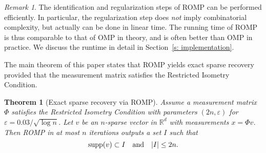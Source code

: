 \documentclass[12pt]{amsart}
\newlength{\algorithmwidth}
\theoremstyle{plain}
\newtheorem{theorem}{Theorem}[section]
\theoremstyle{definition}
\theoremstyle{remark}
\newtheorem*{remark}{Remark}
\numberwithin{equation}{section}
\begin{document}

    \bigskip
  
  \begin{remark} The identification and regularization steps of ROMP can be performed
  efficiently. In particular, the regularization step does \textit{not} imply combinatorial 
  complexity, but actually can be done in linear time. 
  The running time of ROMP is thus comparable to that of OMP in theory, 
  and is often better than OMP in practice. We discuss the runtime in detail in Section~\ref{s: implementation}.
  \end{remark}

The main theorem of this paper states that ROMP yields exact sparse recovery
provided that the measurement matrix satisfies the Restricted Isometry Condition.

\begin{theorem}[Exact sparse recovery via ROMP]\label{T:main}
  Assume a measurement matrix $\Phi$ satisfies the Restricted Isometry Condition 
  with parameters $(2n, {\varepsilon})$ for ${\varepsilon} = 0.03 / \sqrt{\log n}$. 
  Let $v$ be an $n$-sparse vector in ${\mathbb{R}}^d$ with measurements $x = \Phi v$. 
  Then ROMP in at most $n$ iterations outputs a set $I$ such that 
  $$
  {{\rm supp}}(v) \subset I \quad \text{and} \quad |I| \leq 2n.
  $$
\end{theorem}
\end{document}
